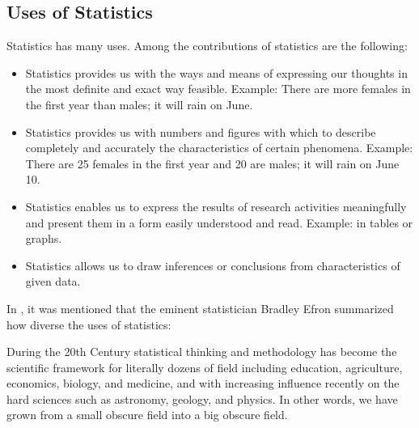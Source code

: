 \subsection*{Uses of Statistics}
Statistics has many uses. Among the contributions of statistics are the following:
\begin{itemize}
\item Statistics provides us with the ways and means of expressing our thoughts in the most
definite and exact way feasible. Example: There are more females in the first year than
males; it will rain on June.
\item Statistics provides us with numbers and figures with which to describe completely and
   accurately the characteristics of certain phenomena. Example: There are 25 females in
  the first year and 20 are males; it will rain on June 10.
\item Statistics enables us to express the results of research activities meaningfully and
   present them in a form easily understood and read. Example: in tables or graphs.
\item Statistics allows us to draw inferences or conclusions from characteristics of given data.
\end{itemize}

In \textcite{psasrtc}, it was mentioned
that the eminent statistician Bradley Efron summarized how diverse the uses of
statistics: %
\begin{Quote}
During the 20th Century statistical thinking and methodology has
become the scientific framework for literally dozens of field including
education, agriculture, economics, biology, and medicine, and with
increasing influence recently on the hard sciences such as astronomy,
geology, and physics. In other words, we have grown from a small
obscure field into a big obscure field.
\end{Quote}
